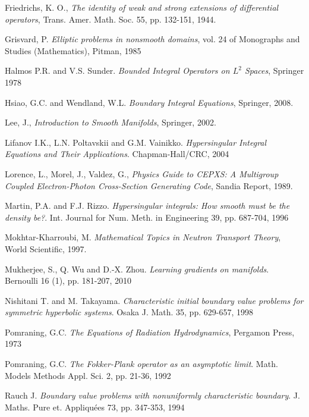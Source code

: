 \documentclass[a4paper,12pt,oneside,reqno]{amsart}
\theoremstyle{theorem}
\begin{document}
\begin{thebibliography}{5}
 Friedrichs, K. O., \emph{The identity of weak and strong extensions of differential operators}, Trans. Amer. Math. Soc. 55, pp. 132-151, 1944.

 
 Grisvard, P. \emph{Elliptic problems in nonsmooth domains}, vol. 24 of
Monographs and Studies (Mathematics), Pitman, 1985

 
  Halmos P.R. and V.S. Sunder. \emph{Bounded Integral Operators on $L^2$ Spaces}, Springer 1978
 
 
 Hsiao, G.C. and Wendland, W.L. \emph{Boundary Integral Equations}, Springer, 2008.

 

 Lee, J., \emph{Introduction to Smooth Manifolds}, Springer, 2002.

Lifanov I.K., L.N. Poltavskii and G.M. Vainikko. \emph{Hypersingular Integral Equations and Their Applications}. Chapman-Hall/CRC, 2004
 
 Lorence, L., Morel, J., Valdez, G., \emph{Physics Guide to CEPXS: A Multigroup Coupled Electron-Photon Cross-Section Generating Code}, Sandia Report, 1989.

 

 Martin, P.A. and F.J. Rizzo. \emph{Hypersingular integrals: How smooth must be the density be?}. Int. Journal for Num. Meth. in Engineering 39, pp. 687-704, 1996
 

 Mokhtar-Kharroubi, M. \emph{Mathematical Topics in Neutron Transport Theory}, World Scientific, 1997.

 Mukherjee, S., Q. Wu and  D.-X. Zhou. \emph{Learning gradients on manifolds}. Bernoulli 16 (1), pp. 181-207, 2010
 
 Nishitani T. and M. Takayama. \emph{Characteristic initial boundary value problems for symmetric hyperbolic systems}. Osaka J. Math. 35, pp. 629-657, 1998
 
 Pomraning, G.C.  \emph{The Equations of Radiation Hydrodynamics}, Pergamon Press, 1973

 Pomraning, G.C. \emph{The Fokker-Plank operator as an asymptotic limit}. Math. Models Methods Appl. Sci. 2, pp. 21-36, 1992 

 
  Rauch J. \emph{Boundary value problems with nonuniformly characteristic boundary}. J. Maths. Pure et. Appliqu\'ees 73, pp. 347-353, 1994 
 


\end{thebibliography}
\end{document}

